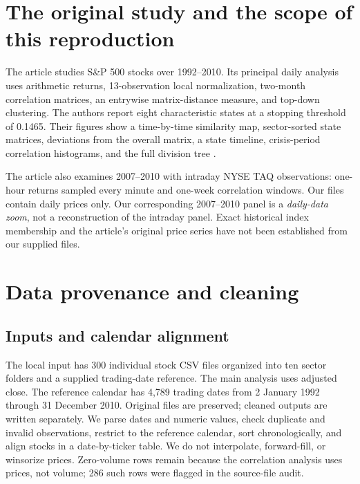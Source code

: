 \documentclass[11pt,a4paper]{article}
\begin{document}
\section{The original study and the scope of this reproduction}
The article studies S\&P 500 stocks over 1992--2010. Its principal daily analysis uses arithmetic returns, 13-observation local normalization, two-month correlation matrices, an entrywise matrix-distance measure, and top-down clustering. The authors report eight characteristic states at a stopping threshold of 0.1465. Their figures show a time-by-time similarity map, sector-sorted state matrices, deviations from the overall matrix, a state timeline, crisis-period correlation histograms, and the full division tree \cite{munnix2012}.

The article also examines 2007--2010 with intraday NYSE TAQ observations: one-hour returns sampled every minute and one-week correlation windows. Our files contain daily prices only. Our corresponding 2007--2010 panel is a \emph{daily-data zoom}, not a reconstruction of the intraday panel. Exact historical index membership and the article's original price series have not been established from our supplied files.

\section{Data provenance and cleaning}
\subsection{Inputs and calendar alignment}
The local input has 300 individual stock CSV files organized into ten sector folders and a supplied trading-date reference. The main analysis uses adjusted close. The reference calendar has 4,789 trading dates from 2 January 1992 through 31 December 2010. Original files are preserved; cleaned outputs are written separately. We parse dates and numeric values, check duplicate and invalid observations, restrict to the reference calendar, sort chronologically, and align stocks in a date-by-ticker table. We do not interpolate, forward-fill, or winsorize prices. Zero-volume rows remain because the correlation analysis uses prices, not volume; 286 such rows were flagged in the source-file audit.
\end{document}

